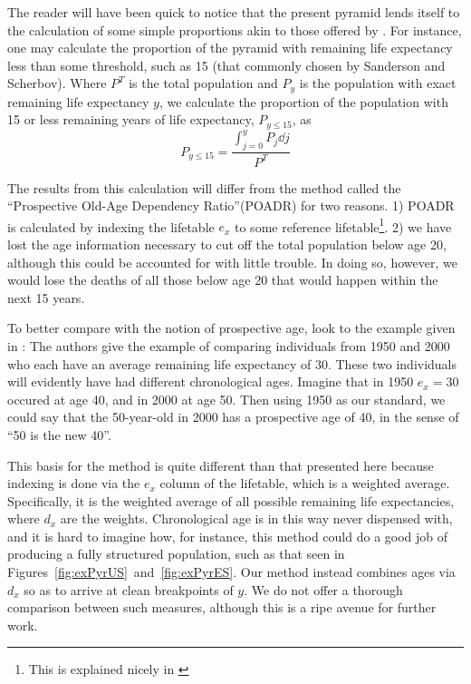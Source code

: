 \FloatBarrier

The reader will have been quick to notice that the present pyramid lends itself
to the calculation of some simple proportions akin to those offered by
\citet[e.g.][]{sanderson2005average}. For instance, one may calculate the
proportion of the pyramid with remaining life expectancy less than some
threshold, such as 15 (that commonly chosen by Sanderson and Scherbov). Where
$P^T$ is the total population and $P_y$ is the population with exact remaining
life expectancy $y$, we calculate the proportion of the population with 15 or
less remaining years of life expectancy, $P_{y \le 15}$, as
\begin{equation}
P_{y \le 15} = \frac{\int _{j=0}^{y} P_j \dd j}{P^T}
\end{equation}

The results from this calculation will differ from the method called the
``Prospective Old-Age Dependency Ratio''(POADR) for two reasons. 1) POADR is
calculated by indexing the lifetable $e_x$ to some reference
lifetable\footnote{This is explained nicely in \citet{sanderson2007new}}. 2)
we have lost the age information necessary to cut off the total population
below age 20, although this could be accounted for with little trouble. In
doing so, however, we would lose the deaths of all those below age 20 that
would happen within the next 15 years. 

To better compare with the notion of prospective age, look to the example given
in \citet{sanderson2007new}: The authors give the example of comparing
individuals from 1950 and 2000 who each have an average remaining life 
expectancy of 30. These two individuals will 
evidently have had different chronological ages. Imagine that in 1950 $e_x = 30$ 
occured at age 40, and in 2000 at age 50. Then using 1950 as our standard, we 
could say that the 50-year-old in 2000 has a prospective age of 40, in the sense
of ``50 is the new 40''. 

This basis for the method is quite different than that presented here because
indexing is done via the $e_x$ column of the lifetable, which is a weighted
average. Specifically, it is the weighted average of all possible remaining life
expectancies, where $d_x$ are the weights. Chronological age is in this way
never dispensed with, and it is hard to imagine how, for instance, this method
could do a good job of producing a fully structured population, such as that
seen in Figures~\ref{fig:exPyrUS}~and~\ref{fig:exPyrES}. Our method instead
combines ages via $d_x$ so as to arrive at clean breakpoints of $y$. We do not
offer a thorough comparison between such measures, although this is a ripe
avenue for further work.

